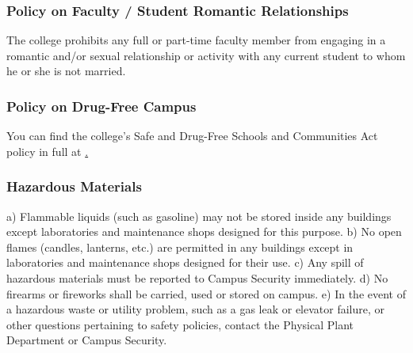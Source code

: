 \documentclass[letterpaper, 11pt]{article}
\begin{document}
		\subsubsection{Policy on Faculty / Student Romantic Relationships}
			The college prohibits any full or part-time faculty member from engaging in a romantic and/or sexual relationship or activity with any current student to whom he or she is not married.
		\subsubsection{Policy on Drug-Free Campus}
			You can find the college's Safe and Drug-Free Schools and Communities Act policy in full at \href{https://www.westmont.edu/_offices/human_resources/on_campus/handbook/2_7drugfree.html}.
		\subsubsection{Hazardous Materials}
			a) Flammable liquids (such as gasoline) may not be stored inside any buildings except laboratories and maintenance shops designed for this purpose.
			b) No open flames (candles, lanterns, etc.) are permitted in any buildings except in laboratories and maintenance shops designed for their use.
			c) Any spill of hazardous materials must be reported to Campus Security immediately.
			d) No firearms or fireworks shall be carried, used or stored on campus.
			e) In the event of a hazardous waste or utility problem, such as a gas leak or elevator failure, or other questions pertaining to safety policies, contact the Physical Plant Department or Campus Security.
\end{document}
